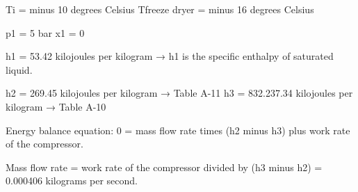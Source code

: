 Ti = minus 10 degrees Celsius  
Tfreeze dryer = minus 16 degrees Celsius  

p1 = 5 bar  
x1 = 0  

h1 = 53.42 kilojoules per kilogram → h1 is the specific enthalpy of saturated liquid.  

h2 = 269.45 kilojoules per kilogram → Table A-11  
h3 = 832.237.34 kilojoules per kilogram → Table A-10  

Energy balance equation:  
0 = mass flow rate times (h2 minus h3) plus work rate of the compressor.  

Mass flow rate = work rate of the compressor divided by (h3 minus h2) = 0.000406 kilograms per second.